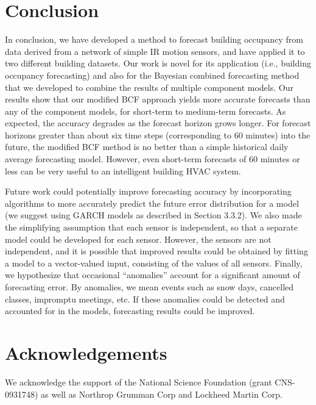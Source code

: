 \documentclass{acm_proc_article-sp}
\begin{document}
\section{Conclusion}
In conclusion, we have developed a method to forecast building occupancy from data derived from a network of simple IR motion sensors, and have applied it to two different building datasets.  Our work is novel for its application (i.e., building occupancy forecasting) and also for the Bayesian combined forecasting method that we developed to combine the results of multiple component models.  Our results show that our modified BCF approach yields more accurate forecasts than any of the component models, for short-term to medium-term forecasts.  As expected, the accuracy degrades as the forecast horizon grows longer.  For forecast horizons greater than about six time steps (corresponding to 60 minutes) into the future, the modified BCF method is no better than a simple historical daily average forecasting model.  However, even short-term forecasts of 60 minutes or less can be very useful to an intelligent building HVAC system.

Future work could potentially improve forecasting accuracy by incorporating algorithms to more accurately predict the future error distribution for a model (we suggest using GARCH models as described in Section 3.3.2).  We also made the simplifying assumption that each sensor is independent, so that a separate model could be developed for each sensor.  However, the sensors are not independent, and it is possible that improved results could be obtained by fitting a model to a vector-valued input, consisting of the values of all sensors.  Finally, we hypothesize that occasional “anomalies” account for a significant amount of forecasting error.  By anomalies, we mean events such as snow days, cancelled classes, impromptu meetings, etc.  If these anomalies could be detected and accounted for in the models, forecasting results could be 
improved.

\section{Acknowledgements}
We acknowledge the support of the National Science Foundation (grant CNS-0931748) as well as Northrop Grumman Corp and Lockheed Martin Corp.


 
\end{document}
